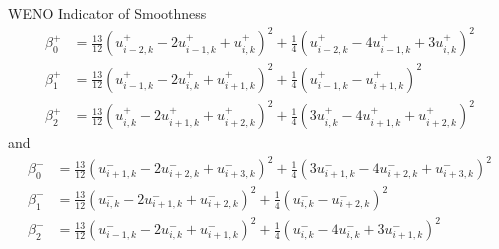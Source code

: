 \documentclass{beamer}
\newcommand{\backupend}{
   \setcounter{framenumber}{\value{finalframe}}
}
\begin{document}
  \begin{frame}{WENO Indicator of Smoothness}
	$$
	 \begin{aligned}
	   \beta_0^+ &= \frac{13}{12}(u^+_{i-2,k} -2u^+_{i-1,k} + u^+_{i  ,k})^2 + \frac{1}{4}( u^+_{i-2,k} - 4u^+_{i-1,k} + 3u^+_{i,k})^2 \\
	   \beta_1^+ &= \frac{13}{12}(u^+_{i-1,k} -2u^+_{i  ,k} + u^+_{i+1,k})^2 + \frac{1}{4}( u^+_{i-1,k} -  u^+_{i+1,k})^2 \\
	   \beta_2^+ &= \frac{13}{12}(u^+_{i  ,k} -2u^+_{i+1,k} + u^+_{i+2,k})^2 + \frac{1}{4}(3u^+_{i  ,k} - 4u^+_{i+1,k} + u^+_{i+2,k} )^2 
	 \end{aligned}
	$$
	and
	$$
	 \begin{aligned}
	   \beta_0^- &= \frac{13}{12}(u^-_{i+1,k} -2u^-_{i+2,k} + u^-_{i+3,k})^2 + \frac{1}{4}(3u^-_{i+1,k} - 4u^-_{i+2,k} + u^-_{i+3,k})^2 \\
	   \beta_1^- &= \frac{13}{12}(u^-_{i  ,k} -2u^-_{i+1,k} + u^-_{i+2,k})^2 + \frac{1}{4}(u^-_{i,k} - u^-_{i+2,k})^2 \\
	   \beta_2^- &= \frac{13}{12}(u^-_{i-1,k} -2u^-_{i  ,k} + u^-_{i+1,k})^2 + \frac{1}{4}(u^-_{i,k} - 4u^-_{i,k} + 3u^-_{i+1,k})^2
	 \end{aligned}
	$$
  \end{frame}

 \backupend
\end{document}
